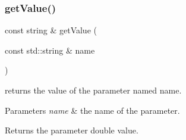 \subsubsection{\texorpdfstring{get\+Value()}{getValue()}}
{\footnotesize\ttfamily const string \& get\+Value (\begin{DoxyParamCaption}\item[{const std\+::string \&}]{name }\end{DoxyParamCaption})}



returns the value of the parameter named {\ttfamily name}. 


\begin{DoxyParams}{Parameters}
{\em name} & the name of the parameter.\\
\hline
\end{DoxyParams}
\begin{DoxyReturn}{Returns}
the parameter double value. 
\end{DoxyReturn}
